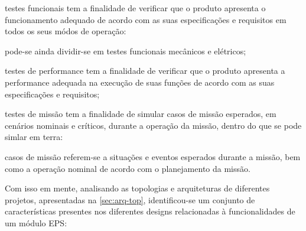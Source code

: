 \begin{alineas}
    \item testes funcionais tem a finalidade de verificar que o produto apresenta o funcionamento adequado de acordo com as suas especificações e requisitos em todos os seus módos de operação:
    \begin{alineas}
        \item pode-se ainda dividir-se em testes funcionais mecânicos e elétricos;
    \end{alineas}
    \item testes de performance tem a finalidade de verificar que o produto apresenta a performance adequada na execução de suas funções de acordo com as suas especificações e requisitos;
    \item testes de missão tem a finalidade de simular casos de missão esperados, em cenários nominais e críticos, durante a operação da missão, dentro do que se pode simlar em terra:
    \begin{alineas}
        \item casos de missão referem-se a situações e eventos esperados durante a missão, bem como a operação nominal de acordo com o planejamento da missão.
    \end{alineas}
\end{alineas}

Com isso em mente, analisando as topologias e arquiteturas de diferentes projetos, apresentadas na \autoref{sec:arq-top}, identificou-se um conjunto de características presentes nos diferentes designs relacionadas à funcionalidades de um módulo \gls{EPS}:

